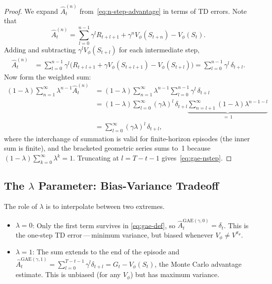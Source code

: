 \begin{proof}
We expand $\hat{A}_t^{(n)}$ from~\eqref{eq:n-step-advantage} in terms of
TD errors.  Note that
\[
\hat{A}_t^{(n)}
= \sum_{l=0}^{n-1}\gamma^l R_{t+l+1} + \gamma^n V_\phi(S_{t+n}) - V_\phi(S_t).
\]
Adding and subtracting $\gamma^l V_\phi(S_{t+l})$ for each intermediate step,
\begin{align*}
\hat{A}_t^{(n)}
&= \sum_{l=0}^{n-1} \gamma^l
   \bigl(R_{t+l+1} + \gamma V_\phi(S_{t+l+1}) - V_\phi(S_{t+l})\bigr)
 = \sum_{l=0}^{n-1}\gamma^l\,\delta_{t+l}.
\end{align*}
Now form the weighted sum:
\begin{align*}
(1-\lambda)\sum_{n=1}^{\infty}\lambda^{n-1}\hat{A}_t^{(n)}
&= (1-\lambda)\sum_{n=1}^{\infty}\lambda^{n-1}
   \sum_{l=0}^{n-1}\gamma^l\,\delta_{t+l} \\
&= (1-\lambda)\sum_{l=0}^{\infty}(\gamma\lambda)^l\,\delta_{t+l}
   \underbrace{\sum_{n=l+1}^{\infty}(1-\lambda)\lambda^{n-1-l}}_{=\,1} \\
&= \sum_{l=0}^{\infty}(\gamma\lambda)^l\,\delta_{t+l},
\end{align*}
where the interchange of summation is valid for finite-horizon episodes
(the inner sum is finite), and the bracketed geometric series sums to~1 because
$(1-\lambda)\sum_{k=0}^{\infty}\lambda^k = 1$.  Truncating at $l = T-t-1$
gives~\eqref{eq:gae-nstep}.
\end{proof}

\subsection{The $\lambda$ Parameter: Bias-Variance Tradeoff}

The role of $\lambda$ is to interpolate between two extremes.

\begin{itemize}[leftmargin=*]
  \item \textbf{$\lambda = 0$}: Only the first term survives in
    \eqref{eq:gae-def}, so $\hat{A}_t^{\mathrm{GAE}(\gamma,0)} = \delta_t$.
    This is the one-step TD error\,---\,minimum variance, but biased whenever
    $V_\phi \neq V^{\pi_\theta}$.
  \item \textbf{$\lambda = 1$}: The sum extends to the end of the episode
    and $\hat{A}_t^{\mathrm{GAE}(\gamma,1)} = \sum_{l=0}^{T-t-1}\gamma^l
    \delta_{t+l} = G_t - V_\phi(S_t)$, the Monte Carlo advantage estimate.
    This is unbiased (for any $V_\phi$) but has maximum variance.
\end{itemize}


